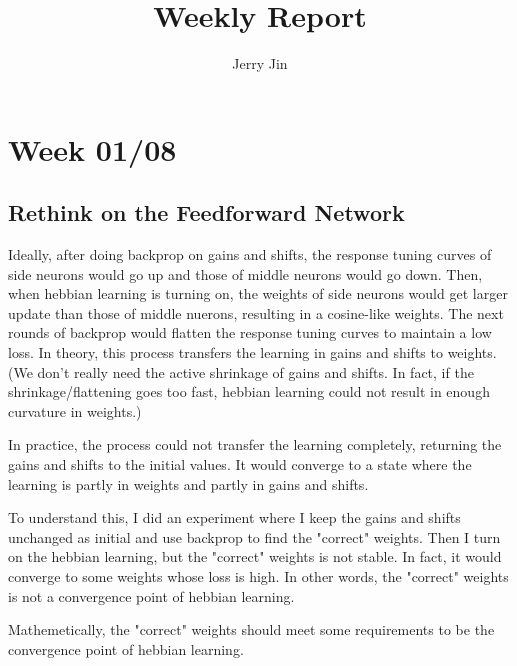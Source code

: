 \documentclass[12pt, a4paper]{article}
\title{Weekly Report}
\author{Jerry Jin}
\begin{document}
\maketitle

\section*{Week 01/08}

\subsection*{Rethink on the Feedforward Network}


Ideally, after doing backprop on gains and shifts, the response tuning curves of side neurons would go up and those of middle neurons would go down. Then, when hebbian learning is turning on, the weights of side neurons would get larger update than those of middle nuerons, resulting in a cosine-like weights. The next rounds of backprop would flatten the response tuning curves to maintain a low loss. In theory, this process transfers the learning in gains and shifts to weights. (We don't really need the active shrinkage of gains and shifts. In fact, if the shrinkage/flattening goes too fast, hebbian learning could not result in enough curvature in weights.)

In practice, the process could not transfer the learning completely, returning the gains and shifts to the initial values. It would converge to a state where the learning is partly in weights and partly in gains and shifts. 


To understand this, I did an experiment where I keep the gains and shifts unchanged as initial and use backprop to find the "correct" weights. Then I turn on the hebbian learning, but the "correct" weights is not stable. In fact, it would converge to some weights whose loss is high. In other words, the "correct" weights is not a convergence point of hebbian learning.


Mathemetically, the "correct" weights should meet some requirements to be the convergence point of hebbian learning.
\end{document}
